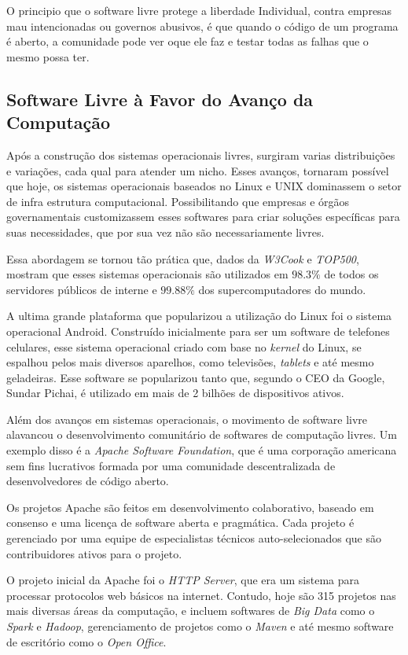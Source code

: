 O principio que o software livre protege a liberdade Individual, contra empresas mau intencionadas ou governos abusivos, é que quando o código de um programa é aberto, a comunidade pode ver oque ele faz e testar todas as falhas que o mesmo possa ter.

\subsection{Software Livre à Favor do Avanço da Computação}
Após a construção dos sistemas operacionais livres, surgiram varias distribuições e variações, cada qual para atender um nicho. Esses avanços, tornaram possível que hoje, os sistemas operacionais baseados no Linux e UNIX dominassem o setor de infra estrutura computacional. Possibilitando que empresas e órgãos governamentais customizassem esses softwares para criar soluções específicas para suas necessidades, que por sua vez não são necessariamente livres.

Essa abordagem se tornou tão prática que, dados da \textit{W3Cook} e \textit{TOP500}, mostram que esses sistemas operacionais são utilizados em $98.3\%$ de todos os servidores públicos de interne e $99.88\%$ dos supercomputadores do mundo. 

A ultima grande plataforma que popularizou a utilização do Linux foi o sistema operacional Android.  Construído inicialmente para ser um software de telefones celulares, esse sistema operacional criado com base no \textit{kernel} do Linux, se espalhou pelos mais diversos aparelhos, como televisões, \textit{tablets} e até mesmo geladeiras. Esse software se popularizou tanto que, segundo o CEO da Google, Sundar Pichai, é utilizado em mais de 2 bilhões de dispositivos ativos.

Além dos avanços em sistemas operacionais, o movimento de software livre alavancou o desenvolvimento comunitário de softwares de computação livres. Um exemplo disso é a \textit{Apache Software Foundation}, que é uma corporação americana sem fins lucrativos formada por uma comunidade descentralizada de desenvolvedores de código aberto. 

Os projetos Apache são feitos em desenvolvimento colaborativo, baseado em consenso e uma licença de software aberta e pragmática. Cada projeto é gerenciado por uma equipe de especialistas técnicos auto-selecionados que são contribuidores ativos para o projeto. 

O projeto inicial da Apache foi o \textit{HTTP Server}, que era um sistema para processar protocolos web básicos na internet. Contudo, hoje são 315 projetos nas mais diversas áreas da computação, e incluem softwares de \textit{Big Data} como o \textit{Spark} e \textit{Hadoop}, gerenciamento de projetos como o \textit{Maven} e até mesmo software de escritório como o \textit{Open Office}.


